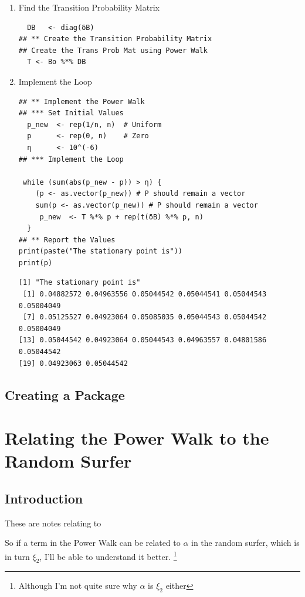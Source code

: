 \documentclass[11pt]{article}
\begin{document}
\begin{enumerate}
\item Find the Transition Probability Matrix
\label{sec:org9f015f4}
\begin{verbatim}
  DB   <- diag(δB)
## ** Create the Transition Probability Matrix
## Create the Trans Prob Mat using Power Walk
  T <- Bo %*% DB
\end{verbatim}

\item Implement the Loop
\label{sec:org501477b}
\begin{verbatim}
## ** Implement the Power Walk
## *** Set Initial Values
  p_new  <- rep(1/n, n)  # Uniform
  p      <- rep(0, n)    # Zero
  η      <- 10^(-6)
## *** Implement the Loop

 while (sum(abs(p_new - p)) > η) {
    (p <- as.vector(p_new)) # P should remain a vector
    sum(p <- as.vector(p_new)) # P should remain a vector
     p_new  <- T %*% p + rep(t(δB) %*% p, n)
  }
## ** Report the Values
print(paste("The stationary point is"))
print(p)
\end{verbatim}

\begin{verbatim}
[1] "The stationary point is"
 [1] 0.04882572 0.04963556 0.05044542 0.05044541 0.05044543 0.05004049
 [7] 0.05125527 0.04923064 0.05085035 0.05044543 0.05044542 0.05004049
[13] 0.05044542 0.04923064 0.05044543 0.04963557 0.04801586 0.05044542
[19] 0.04923063 0.05044542
\end{verbatim}
\end{enumerate}

\subsection{Creating a Package}
\label{sec:orga855ef6}
\section{Relating the Power Walk to the Random Surfer}
\label{relating-terms-in-power-walk-to-random-surfer}
\subsection{Introduction}
\label{sec:org74965c9}
These are notes relating to \cite[]{parkPowerWalkRevisiting2013}

So if a term in the Power Walk can be related to \(\alpha\) in the random
surfer, which is in turn \(\xi_2\), I'll be able to understand it better. \footnote{Although I'm not quite sure why \(\alpha\) is \(\xi_{2}\) either}
\end{document}
